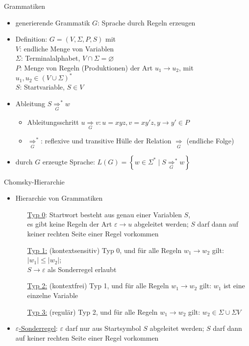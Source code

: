 \begin{frame}{Grammatiken}
	\begin{itemize}
		\item generierende Grammatik $G$: Sprache durch Regeln erzeugen
		\item Definition: $G=(V, \Sigma, P, S)$ mit\\
		$V$: endliche Menge von Variablen\\
		$\Sigma$: Terminalalphabet, $V \cap \Sigma = \varnothing$\\
		$P$: Menge von Regeln (Produktionen) der Art $u_1 \rightarrow u_2$, mit $u_1, u_2 \in \left(V \cup \Sigma\right)^*$\\
		$S$: Startvariable, $S \in V$
		\item Ableitung $S \underset{G}{\Rightarrow}^* w$
		\begin{itemize}
			\item Ableitungsschritt $u \underset{G}{\Rightarrow} v: u=xyz, v=xy'z, y\rightarrow y' \in P$
			\item $\underset{G}{\Rightarrow}^*$: reflexive und transitive Hülle der Relation $\underset{G}{\Rightarrow}$ (endliche Folge)
		\end{itemize}
		\item durch $G$ erzeugte Sprache: $L(G)=\left\{w \in \Sigma^* \mid S \underset{G}{\Rightarrow}^* w\right\}$
	\end{itemize}
\end{frame}

\begin{frame}{Chomsky-Hierarchie}
	\begin{itemize}
		\item Hierarchie von Grammatiken
		\begin{itemize}
			\item[\underline{Typ 0}:] Startwort besteht aus genau einer Variablen $S$,\\
			es gibt keine Regeln der Art $\varepsilon \rightarrow u$ abgeleitet werden; $S$ darf dann auf keiner rechten Seite einer Regel vorkommen
			\item[\underline{Typ 1:}] (kontextsensitiv) Typ 0, und für alle Regeln $w_1 \rightarrow w_2$ gilt: $|w_1| \leq |w_2|$;\\
			$S \rightarrow \varepsilon$ als Sonderregel erlaubt
			\item[\underline{Typ 2:}] (kontextfrei) Typ 1, und für alle Regeln $w_1 \rightarrow w_2$ gilt: $w_1$ ist eine einzelne Variable
			\item[\underline{Typ 3:}] (regulär) Typ 2, und für alle Regeln $w_1 \rightarrow w_2$ gilt: $w_2 \in \Sigma \cup \Sigma V$
		\end{itemize}
		\item \underline{$\varepsilon$-Sonderregel}: $\varepsilon$ darf nur aus Startsymbol $S$ abgeleitet werden; $S$ darf dann auf keiner rechten Seite einer Regel vorkommen
	\end{itemize}
\end{frame}

